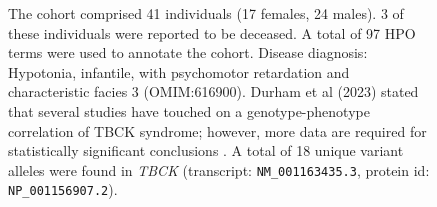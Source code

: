 \begin{figure}[htbp]
\vspace{2em}

\caption{ The cohort comprised 41 individuals (17 females, 24 males). 3 of these individuals were reported to be deceased. A total of 97 HPO terms were used to annotate the cohort. 
Disease diagnosis: Hypotonia, infantile, with psychomotor retardation and characteristic facies 3 (OMIM:616900). 
Durham et al (2023) stated that several studies have touched on a genotype-phenotype correlation of TBCK syndrome; however, more data are required for statistically significant conclusions \cite{PMID_37455236}. 
A total of 18 unique variant alleles were found in \textit{TBCK} (transcript: \texttt{NM\_001163435.3}, protein id: \texttt{NP\_001156907.2}).}
\end{figure}
